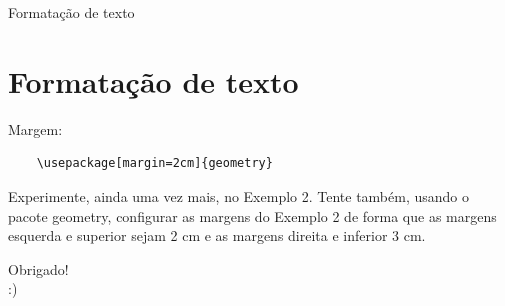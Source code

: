 \documentclass[12pt]{beamer}
\begin{document}
\begin{frame}[fragile]{Formatação de texto}
  \section{Formatação de texto}

  Margem:\\
  \begin{verbatim}
    \usepackage[margin=2cm]{geometry}
  \end{verbatim}
  
  Experimente, ainda uma vez mais, no Exemplo 2. Tente também, usando o pacote geometry, configurar as margens do Exemplo 2 de forma que as margens esquerda e superior sejam 2 cm e as margens direita e inferior 3 cm.
\end{frame}

\begin{frame}
  \begin{center}
    \large Obrigado!\\
    :)
  \end{center}
\end{frame}
\end{document}
